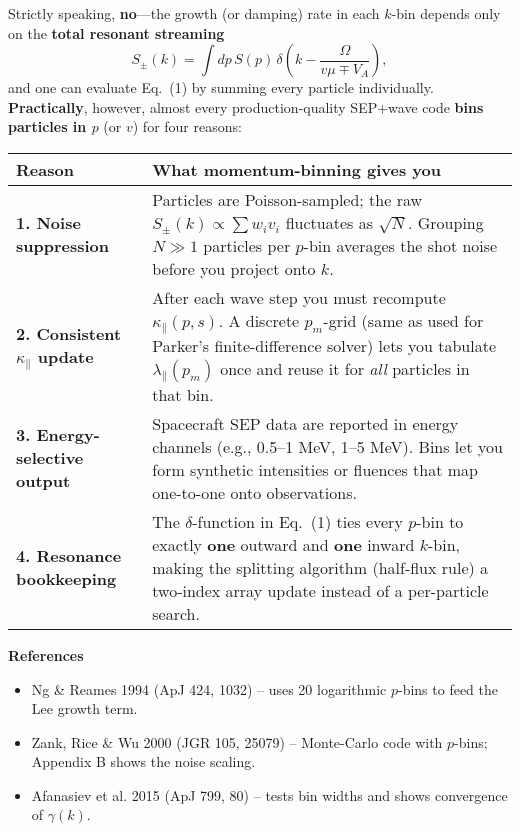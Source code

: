 Strictly speaking, \textbf{no}—the growth (or damping) rate in each \(k\)-bin depends only on the \textbf{total resonant streaming}
\[
S_\pm(k) = \int dp\, S(p)\, \delta\left(k - \frac{\Omega}{v\mu \mp V_A}\right),
\tag{1}
\]
and one can evaluate Eq.~(1) by summing every particle individually.
\textbf{Practically}, however, almost every production‐quality SEP+wave code \textbf{bins particles in \(p\)} (or \(v\)) for four reasons:

\begin{table}[h!]
\centering
\begin{tabular}{|l|p{11.5cm}|}
\hline
\textbf{Reason} & \textbf{What momentum-binning gives you} \\
\hline
\textbf{1. Noise suppression} & Particles are Poisson-sampled; the raw \( S_\pm(k) \propto \sum w_i v_i \) fluctuates as \( \sqrt{N} \). Grouping \( N \gg 1 \) particles per \(p\)-bin averages the shot noise before you project onto \(k\). \\
\hline
\textbf{2. Consistent \( \kappa_\parallel \) update} & After each wave step you must recompute \( \kappa_\parallel(p,s) \). A discrete \( p_m \)-grid (same as used for Parker’s finite-difference solver) lets you tabulate \( \lambda_\parallel(p_m) \) once and reuse it for \emph{all} particles in that bin. \\
\hline
\textbf{3. Energy-selective output} & Spacecraft SEP data are reported in energy channels (e.g., 0.5–1 MeV, 1–5 MeV). Bins let you form synthetic intensities or fluences that map one-to-one onto observations. \\
\hline
\textbf{4. Resonance bookkeeping} & The \( \delta \)-function in Eq.~(1) ties every \(p\)-bin to exactly \textbf{one} outward and \textbf{one} inward \(k\)-bin, making the splitting algorithm (half‐flux rule) a two-index array update instead of a per-particle search. \\
\hline
\end{tabular}
\end{table}

\noindent\textbf{References}
\begin{itemize}
\item Ng \& Reames 1994 (ApJ 424, 1032) – uses 20 logarithmic \(p\)-bins to feed the Lee growth term.
\item Zank, Rice \& Wu 2000 (JGR 105, 25079) – Monte-Carlo code with \(p\)-bins; Appendix B shows the noise scaling.
\item Afanasiev et al. 2015 (ApJ 799, 80) – tests bin widths and shows convergence of \( \gamma(k) \).
\end{itemize}

